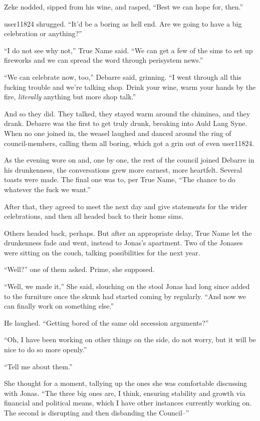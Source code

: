 Zeke nodded, sipped from his wine, and rasped, ``Best we can hope for, then.''

user11824 shrugged. ``It'd be a boring as hell end. Are we going to have a big celebration or anything?''

``I do not see why not,'' True Name said. ``We can get a few of the sims to set up fireworks and we can spread the word through perisystem news.''

``We can celebrate now, too,'' Debarre said, grinning. ``I went through all this fucking trouble and we're talking shop. Drink your wine, warm your hands by the fire, \emph{literally} anything but more shop talk.''

And so they did. They talked, they stayed warm around the chiminea, and they drank. Debarre was the first to get truly drunk, breaking into Auld Lang Syne. When no one joined in, the weasel laughed and danced around the ring of council-members, calling them all boring, which got a grin out of even user11824.

As the evening wore on and, one by one, the rest of the council joined Debarre in his drunkenness, the conversations grew more earnest, more heartfelt. Several toasts were made. The final one was to, per True Name, ``The chance to do whatever the fuck we want.''

After that, they agreed to meet the next day and give statements for the wider celebrations, and then all headed back to their home sims.

Others headed back, perhaps. But after an appropriate delay, True Name let the drunkenness fade and went, instead to Jonas's apartment. Two of the Jonases were sitting on the couch, talking possibilities for the next year.

``Well?'' one of them asked. Prime, she supposed.

``Well, we made it,'' She said, slouching on the stool Jonas had long since added to the furniture once the skunk had started coming by regularly. ``And now we can finally work on something else.''

He laughed. ``Getting bored of the same old secession arguments?''

``Oh, I have been working on other things on the side, do not worry, but it will be nice to do so more openly.''

``Tell me about them.''

She thought for a moment, tallying up the ones she was comfortable discussing with Jonas. ``The three big ones are, I think, ensuring stability and growth via financial and political means, which I have other instances currently working on. The second is disrupting and then disbanding the Council--''


